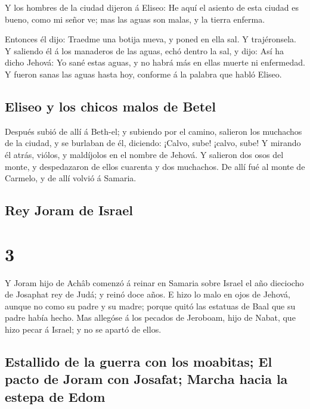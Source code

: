  Y los hombres de la ciudad dijeron á Eliseo: He aquí el
asiento de esta ciudad es bueno, como mi señor ve; mas las aguas son
malas, y la tierra enferma.

 Entonces él dijo: Traedme una botija nueva, y poned en
ella sal. Y trajéronsela.  Y saliendo él á los manaderos
de las aguas, echó dentro la sal, y dijo: Así ha dicho Jehová: Yo sané
estas aguas, y no habrá más en ellas muerte ni enfermedad.
 Y fueron sanas las aguas hasta hoy, conforme á la
palabra que habló Eliseo.

\hypertarget{eliseo-y-los-chicos-malos-de-betel}{%
\subsection{Eliseo y los chicos malos de
Betel}\label{eliseo-y-los-chicos-malos-de-betel}}

 Después subió de allí á Beth-el; y subiendo por el
camino, salieron los muchachos de la ciudad, y se burlaban de él,
diciendo: ¡Calvo, sube! ¡calvo, sube!  Y mirando él
atrás, viólos, y maldíjolos en el nombre de Jehová. Y salieron dos osos
del monte, y despedazaron de ellos cuarenta y dos muchachos.
 De allí fué al monte de Carmelo, y de allí volvió á
Samaria.

\hypertarget{rey-joram-de-israel}{%
\subsection{Rey Joram de Israel}\label{rey-joram-de-israel}}

\hypertarget{section-12-3}{%
\section{3}\label{section-12-3}}

 Y Joram hijo de Achâb comenzó á reinar en Samaria sobre
Israel el año dieciocho de Josaphat rey de Judá; y reinó doce años.
 E hizo lo malo en ojos de Jehová, aunque no como su padre
y su madre; porque quitó las estatuas de Baal que su padre había hecho.
 Mas allegóse á los pecados de Jeroboam, hijo de Nabat,
que hizo pecar á Israel; y no se apartó de ellos.

\hypertarget{estallido-de-la-guerra-con-los-moabitas-el-pacto-de-joram-con-josafat-marcha-hacia-la-estepa-de-edom}{%
\subsection{Estallido de la guerra con los moabitas; El pacto de Joram
con Josafat; Marcha hacia la estepa de
Edom}\label{estallido-de-la-guerra-con-los-moabitas-el-pacto-de-joram-con-josafat-marcha-hacia-la-estepa-de-edom}}

